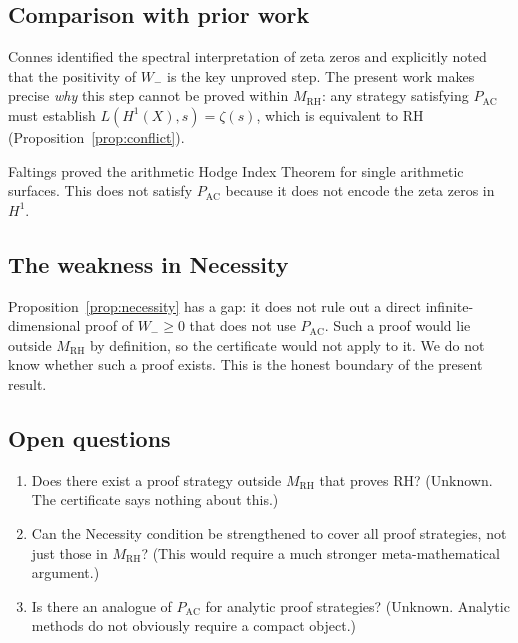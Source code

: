 \documentclass[12pt]{article}
\newcommand{\MRH}{M_{\mathrm{RH}}}
\newcommand{\PAC}{P_{\mathrm{AC}}}
\begin{document}
\subsection{Comparison with prior work}

Connes \cite{connes1999} identified the spectral interpretation of
zeta zeros and explicitly noted that the positivity of $W_-$ is the
key unproved step. The present work makes precise \emph{why} this
step cannot be proved within $\MRH$: any strategy satisfying $\PAC$
must establish $L(H^1(X),s) = \zeta(s)$, which is equivalent to RH
(Proposition~\ref{prop:conflict}).

Faltings \cite{faltings1984} proved the arithmetic Hodge Index Theorem
for single arithmetic surfaces. This does not satisfy $\PAC$ because
it does not encode the zeta zeros in $H^1$.

\subsection{The weakness in Necessity}

Proposition~\ref{prop:necessity} has a gap: it does not rule out a
direct infinite-dimensional proof of $W_- \geq 0$ that does not use
$\PAC$. Such a proof would lie outside $\MRH$ by definition, so the
certificate would not apply to it. We do not know whether such a proof
exists. This is the honest boundary of the present result.

\subsection{Open questions}

\begin{enumerate}
\item Does there exist a proof strategy outside $\MRH$ that proves RH?
  (Unknown. The certificate says nothing about this.)
\item Can the Necessity condition be strengthened to cover all proof
  strategies, not just those in $\MRH$? (This would require a much
  stronger meta-mathematical argument.)
\item Is there an analogue of $\PAC$ for analytic proof strategies?
  (Unknown. Analytic methods do not obviously require a compact object.)
\end{enumerate}
\end{document}
